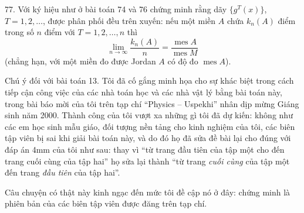 \begin{problem}{77.}
	Với ký hiệu như ở bài toán 74 và 76 chứng minh rằng dãy $\{g^T(x)\}$, $T=1, 2, \dotsc$, được phân phối đều trên xuyến: nếu một miền $A$ chứa $k_n(A)$ điểm trong số $n$ điểm với $T=1, 2, \dotsc, n$ thì
	\begin{equation*}
		\lim_{n \to \infty} \frac{k_n(A)}{n}=\frac{\operatorname{mes} A}{\operatorname{mes} M}
	\end{equation*}
	(chẳng hạn, với một miền đo được Jordan $A$ có độ đo $\operatorname{mes} A$).
\end{problem}

\vfill
\noindent\begin{minipage}{\linewidth}
\begin{note}{Chú ý đối với bài toán 13.}
	Tôi đã cố gắng minh họa cho sự khác biệt trong cách tiếp cận công việc của các nhà toán học và các nhà vật lý bằng bài toán này, trong bài báo mời của tôi trên tạp chí \enquote{Physics -- Uspekhi} nhân dịp mừng Giáng sinh năm 2000. Thành công của tôi vượt xa những gì tôi đã dự kiến: không như các em học sinh mẫu giáo, đối tượng nền tảng cho kinh nghiệm của tôi, các biên tập viên bị sai khi giải bài toán này, và do đó họ đã sửa đề bài lại cho đúng với đáp án 4mm của tôi như sau: thay vì \enquote{từ trang đầu tiên của tập một cho đến trang cuối cùng của tập hai} họ sửa lại thành \enquote{từ trang \emph{cuối cùng} của tập một đến trang \emph{đầu tiên} của tập hai}.

	Câu chuyện có thật này kinh ngạc đến mức tôi đề cập nó ở đây: chứng minh là phiên bản của các biên tập viên được đăng trên tạp chí.
\end{note}
\end{minipage}
\clearpage

